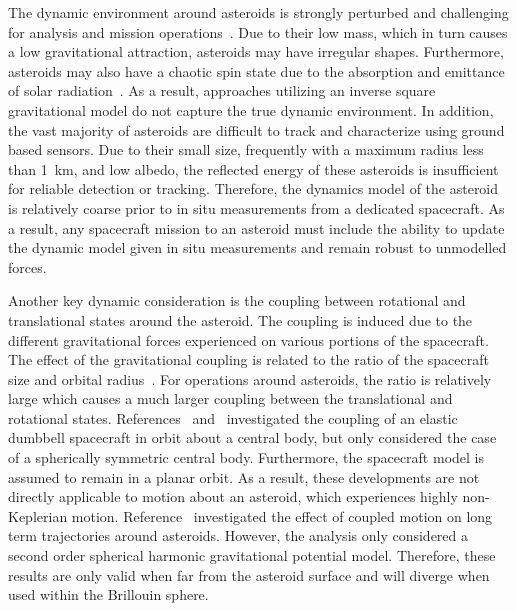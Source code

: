 \documentclass[journal]{new-aiaa}
\begin{document}
The dynamic environment around asteroids is strongly perturbed and challenging for analysis and mission operations~\cite{scheeres2012}.
Due to their low mass, which in turn causes a low gravitational attraction, asteroids may have irregular shapes.
Furthermore, asteroids may also have a chaotic spin state due to the absorption and emittance of solar radiation~\cite{rubincam2000}.
As a result, approaches utilizing an inverse square gravitational model do not capture the  true dynamic environment.
In addition, the vast majority of asteroids are difficult to track and characterize using ground based sensors.
Due to their small size, frequently with a maximum radius less than \SI{1}{\kilo\meter}, and low albedo, the reflected energy of these asteroids is insufficient for reliable detection or tracking.
Therefore, the dynamics model of the asteroid is relatively coarse prior to in situ measurements from a dedicated spacecraft.
As a result, any spacecraft mission to an asteroid must include the ability to update the dynamic model given in situ measurements and remain robust to unmodelled forces.

Another key dynamic consideration is the coupling between rotational and translational states around the asteroid.
The coupling is induced due to the different gravitational forces experienced on various portions of the spacecraft. 
The effect of the gravitational coupling is related to the ratio of the spacecraft size and orbital radius~\cite{hughes2004}.
For operations around asteroids, the ratio is relatively large which causes a much larger coupling between the translational and rotational states.
References~ and~ investigated the coupling of an elastic dumbbell spacecraft in orbit about a central body, but only considered the case of a spherically symmetric central body.
Furthermore, the spacecraft model is assumed to remain in a planar orbit.
As a result, these developments are not directly applicable to motion about an asteroid, which experiences highly non-Keplerian motion.
Reference~ investigated the effect of coupled motion on long term trajectories around asteroids.
However, the analysis only considered a second order spherical harmonic gravitational potential model. 
Therefore, these results are only valid when far from the asteroid surface and will diverge when used within the Brillouin sphere.
\end{document}
